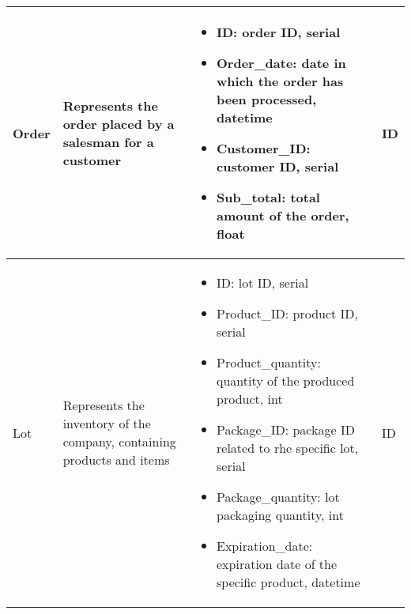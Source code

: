 \begin{longtable}{|p{}|p{} |p{}|p{} |}
    Order & Represents the order placed by a salesman for a customer &
    \begin{itemize}
        \vspace{-1em}
        \item ID:   order ID, serial
        \item Order\_date:   date in which the order has been processed, datetime
        \item Customer\_ID:   customer ID, serial
        \item Sub\_total:   total amount of the order, float            %
    \end{itemize}
    &  ID \\\hline


    Lot & Represents the inventory of the company, containing products and items &
    \begin{itemize}
        \vspace{-1em}
        \item ID:   lot ID, serial
        \item Product\_ID:   product ID, serial
        \item Product\_quantity:   quantity of the produced product, int
        \item Package\_ID:   package ID related to rhe specific lot, serial
        \item Package\_quantity:   lot packaging quantity, int
        \item Expiration\_date:   expiration date of the specific product, datetime
    \end{itemize}
    &  ID \\\hline



\end{longtable}
